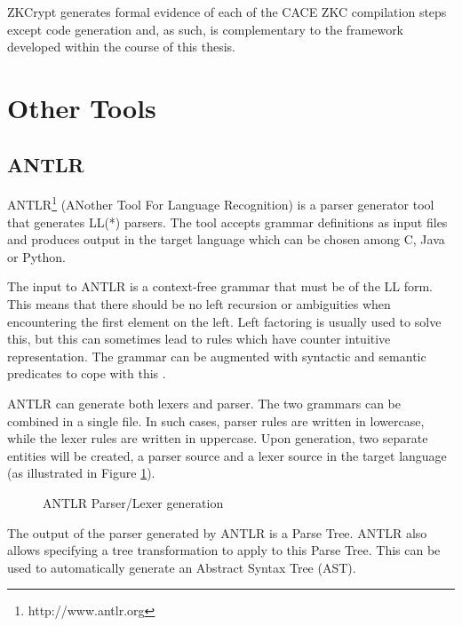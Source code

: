 ZKCrypt generates formal evidence of each of the CACE ZKC compilation
steps except code generation and, as such, is complementary to the
framework developed within the course of this thesis.

\section{Other Tools}

\subsection{ANTLR}

ANTLR\footnote{http://www.antlr.org} (ANother Tool For Language
Recognition) is a parser generator tool that generates LL(*)
parsers. The tool accepts grammar definitions as input files and
produces output in the target language which can be chosen among C,
Java or Python.

The input to ANTLR is a context-free grammar that must be of the LL
form. This means that there should be no left recursion or ambiguities
when encountering the first element on the left. Left factoring is
usually used to solve this, but this can sometimes lead to rules which
have counter intuitive representation. The grammar can be augmented with
syntactic and semantic predicates to cope with this \cite{ANTLR,ANTLR2}.

ANTLR can generate both lexers and parser. The two grammars can be
combined in a single file.  In such cases, parser rules are written in
lowercase, while the lexer rules are written in uppercase. Upon
generation, two separate entities will be created, a parser source and
a lexer source in the target language (as illustrated in Figure
\ref{fig:antlr_parser_lexer}).

\begin{figure}[hb!]
  \centering
  \caption{ANTLR Parser/Lexer generation}
  \label{fig:antlr_parser_lexer}
\end{figure}

The output of the parser generated by ANTLR is a Parse Tree. ANTLR
also allows specifying a tree transformation to apply to this Parse
Tree. This can be used to automatically generate an Abstract Syntax
Tree (AST).

